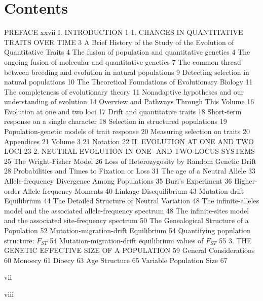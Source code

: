 \documentclass{article}
\begin{document}
\section{Contents}
PREFACE xxvii
I. INTRODUCTION 1
1. CHANGES IN QUANTITATIVE TRAITS OVER TIME 3
A Brief History of the Study of the Evolution of Quantitative Traits 4
The fusion of population and quantitative genetics 4
The ongoing fusion of molecular and quantitative genetics 7
The common thread between breeding and evolution in natural populations 9
Detecting selection in natural populations 10
The Theoretical Foundations of Evolutionary Biology 11
The completeness of evolutionary theory 11
Nonadaptive hypotheses and our understanding of evolution 14
Overview and Pathways Through This Volume 16
Evolution at one and two loci 17
Drift and quantitative traits 18
Short-term response on a single character 18
Selection in structured populations 19
Population-genetic models of trait response 20
Measuring selection on traits 20
Appendices 21
Volume 3 21
Notation 22
II. EVOLUTION AT ONE AND TWO LOCI 23
2. NEUTRAL EVOLUTION IN ONE- AND TWO-LOCUS SYSTEMS 25
The Wright-Fisher Model 26
Loss of Heterozygosity by Random Genetic Drift 28
Probabilities and Times to Fixation or Loss 31
The age of a Neutral Allele 33
Allele-frequency Divergence Among Populations 35
Buri's Experiment 36
Higher-order Allele-frequency Moments 40
Linkage Disequilibrium 43
Mutation-drift Equilibrium 44
The Detailed Structure of Neutral Variation 48
The infinite-alleles model and the associated allele-frequency spectrum 48
The infinite-sites model and the associated site-frequency spectrum 50
The Genealogical Structure of a Population 52
Mutation-migration-drift Equilibrium 54
Quantifying population structure:  $ F_{ST} $ 54
Mutation-migration-drift equilibrium values of  $ F_{ST} $ 55
3. THE GENETIC EFFECTIVE SIZE OF A POPULATION 59
General Considerations 60
Monoecy 61
Dioecy 63
Age Structure 65
Variable Population Size 67

vii

viii
\end{document}
